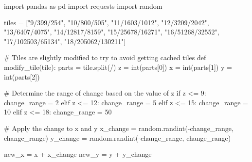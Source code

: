 \documentclass[
  oneside,
  open=any]{scrbook}
\newenvironment{Shaded}{\begin{snugshade}}{\end{snugshade}}
\newcommand{\BuiltInTok}[1]{\textcolor[rgb]{0.00,0.23,0.31}{#1}}
\newcommand{\CommentTok}[1]{\textcolor[rgb]{0.37,0.37,0.37}{#1}}
\newcommand{\ControlFlowTok}[1]{\textcolor[rgb]{0.00,0.23,0.31}{#1}}
\newcommand{\DecValTok}[1]{\textcolor[rgb]{0.68,0.00,0.00}{#1}}
\newcommand{\ImportTok}[1]{\textcolor[rgb]{0.00,0.46,0.62}{#1}}
\newcommand{\KeywordTok}[1]{\textcolor[rgb]{0.00,0.23,0.31}{#1}}
\newcommand{\NormalTok}[1]{\textcolor[rgb]{0.00,0.23,0.31}{#1}}
\newcommand{\OperatorTok}[1]{\textcolor[rgb]{0.37,0.37,0.37}{#1}}
\newcommand{\StringTok}[1]{\textcolor[rgb]{0.13,0.47,0.30}{#1}}
\begin{document}
\begin{Shaded}
\begin{Highlighting}[]
\ImportTok{import}\NormalTok{ pandas }\ImportTok{as}\NormalTok{ pd}
\ImportTok{import}\NormalTok{ requests}
\ImportTok{import}\NormalTok{ random}

\NormalTok{tiles }\OperatorTok{=}\NormalTok{ [}\StringTok{"9/399/254"}\NormalTok{, }\StringTok{"10/800/505"}\NormalTok{, }\StringTok{"11/1603/1012"}\NormalTok{,  }\StringTok{"12/3209/2042"}\NormalTok{, }
\StringTok{"13/6407/4075"}\NormalTok{, }\StringTok{"14/12817/8159"}\NormalTok{, }\StringTok{"15/25678/16271"}\NormalTok{, }\StringTok{"16/51268/32552"}\NormalTok{, }
\StringTok{"17/102503/65134"}\NormalTok{, }\StringTok{"18/205062/130211"}\NormalTok{]}

\CommentTok{\# Tiles are slightly modified to try to avoid getting cached tiles}
\KeywordTok{def}\NormalTok{ modify\_tile(tile):}
\NormalTok{    parts }\OperatorTok{=}\NormalTok{ tile.split(}\StringTok{\textquotesingle{}/\textquotesingle{}}\NormalTok{)}
\NormalTok{    z }\OperatorTok{=} \BuiltInTok{int}\NormalTok{(parts[}\DecValTok{0}\NormalTok{])}
\NormalTok{    x }\OperatorTok{=} \BuiltInTok{int}\NormalTok{(parts[}\DecValTok{1}\NormalTok{])}
\NormalTok{    y }\OperatorTok{=} \BuiltInTok{int}\NormalTok{(parts[}\DecValTok{2}\NormalTok{])}

    \CommentTok{\# Determine the range of change based on the value of z}
    \ControlFlowTok{if}\NormalTok{ z }\OperatorTok{\textless{}=} \DecValTok{9}\NormalTok{:}
\NormalTok{        change\_range }\OperatorTok{=} \DecValTok{2}
    \ControlFlowTok{elif}\NormalTok{ z }\OperatorTok{\textless{}=} \DecValTok{12}\NormalTok{:}
\NormalTok{        change\_range }\OperatorTok{=} \DecValTok{5}
    \ControlFlowTok{elif}\NormalTok{ z }\OperatorTok{\textless{}=} \DecValTok{15}\NormalTok{:}
\NormalTok{        change\_range }\OperatorTok{=} \DecValTok{10}
    \ControlFlowTok{elif}\NormalTok{ z }\OperatorTok{\textless{}=} \DecValTok{18}\NormalTok{:}
\NormalTok{        change\_range }\OperatorTok{=} \DecValTok{50}

    \CommentTok{\# Apply the change to x and y}
\NormalTok{    x\_change }\OperatorTok{=}\NormalTok{ random.randint(}\OperatorTok{{-}}\NormalTok{change\_range, change\_range)}
\NormalTok{    y\_change }\OperatorTok{=}\NormalTok{ random.randint(}\OperatorTok{{-}}\NormalTok{change\_range, change\_range)}

\NormalTok{    new\_x }\OperatorTok{=}\NormalTok{ x }\OperatorTok{+}\NormalTok{ x\_change}
\NormalTok{    new\_y }\OperatorTok{=}\NormalTok{ y }\OperatorTok{+}\NormalTok{ y\_change}


\end{Highlighting}
\end{Shaded}
\end{document}
